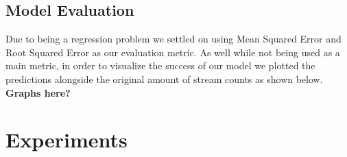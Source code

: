 \documentclass[11pt]{article}
\begin{document}
\subsection{Model Evaluation}
Due to being a regression problem we settled on using Mean Squared Error and Root Squared Error as our evaluation metric. As well while not being used as a main metric, in order to visualize the success of our model we plotted the predictions alongside the original amount of stream counts as shown below. \textbf{Graphs here?}



% 
% 
% 
% 
\section{Experiments}

\end{document}

